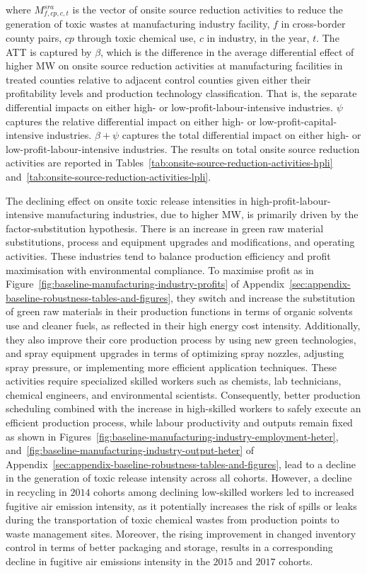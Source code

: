 \documentclass[authoryear, preprint, twocolumn, 1p]{elsarticle}
\begin{document}
    where $M_{f,cp,c,t}^{sra}$ is the vector of onsite source reduction activities to reduce the generation of toxic wastes at manufacturing industry facility, $f$ in cross-border county pairs, $cp$ through toxic chemical use, $c$ in industry, in the year, $t$. The ATT is captured by $\beta$, which is the difference in the average differential effect of higher MW on onsite source reduction activities at manufacturing facilities in treated counties relative to adjacent control counties given either their profitability levels and production technology classification. That is, the separate differential impacts on either high- or low-profit-labour-intensive industries. $\psi$ captures the relative differential impact on either high- or low-profit-capital-intensive industries. $\beta + \psi$ captures the total differential impact on either high- or low-profit-labour-intensive industries. The results on total onsite source reduction activities are reported in Tables~\ref{tab:onsite-source-reduction-activities-hpli} and~\ref{tab:onsite-source-reduction-activities-lpli}.

    The declining effect on onsite toxic release intensities in high-profit-labour-intensive manufacturing industries, due to higher MW, is primarily driven by the factor-substitution hypothesis. There is an increase in green raw material substitutions, process and equipment upgrades and modifications, and operating activities. These industries tend to balance production efficiency and profit maximisation with environmental compliance. To maximise profit as in Figure~\ref{fig:baseline-manufacturing-industry-profits} of Appendix~\ref{sec:appendix-baseline-robustness-tables-and-figures}, they switch and increase the substitution of green raw materials in their production functions in terms of organic solvents use and cleaner fuels, as reflected in their high energy cost intensity. Additionally, they also improve their core production process by using new green technologies, and spray equipment upgrades in terms of optimizing spray nozzles, adjusting spray pressure, or implementing more efficient application techniques. These activities require specialized skilled workers such as chemists, lab technicians, chemical engineers, and environmental scientists. Consequently, better production scheduling combined with the increase in high-skilled workers to safely execute an efficient production process, while labour productivity and outputs remain fixed as shown in Figures~\ref{fig:baseline-manufacturing-industry-employment-heter}, and~\ref{fig:baseline-manufacturing-industry-output-heter} of Appendix~\ref{sec:appendix-baseline-robustness-tables-and-figures}, lead to a decline in the generation of toxic release intensity across all cohorts. However, a decline in recycling in $2014$ cohorts among declining low-skilled workers led to increased fugitive air emission intensity, as it potentially increases the risk of spills or leaks during the transportation of toxic chemical wastes from production points to waste management sites. Moreover, the rising improvement in changed inventory control in terms of better packaging and storage, results in a corresponding decline in fugitive air emissions intensity in the $2015$ and $2017$ cohorts.
    
\end{document}
